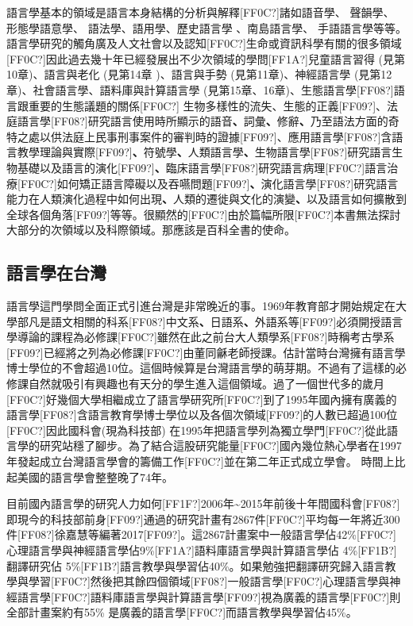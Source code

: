 語言學基本的領域是語言本身結構的分析與解釋[FF0C?]諸如語音學、 聲韻學、 形態學語意學、 語法學、語用學、歷史語言學 、南島語言學、 手語語言學等等。語言學研究的觸角廣及人文社會以及認知[FF0C?]生命或資訊科學有關的很多領域[FF0C?]因此過去幾十年已經發展出不少次領域的學問[FF1A?]兒童語言習得 (見第10章)、語言與老化 (見第14章 )、語言與手勢 (見第11章)、神經語言學 (見第12章)、社會語言學、語料庫與計算語言學 (見第15章、16章)、生態語言學[FF08?]語言跟重要的生態議題的關係[FF0C?] 生物多樣性的流失、生態的正義[FF09?]、法庭語言學[FF08?]研究語言使用時所顯示的語音\textbf{、}詞彙\textbf{、}修辭\textbf{、}乃至語法方面的奇特之處以供法庭上民事刑事案件的審判時的證據[FF09?]、應用語言學[FF08?]含語言教學理論與實際[FF09?]\textbf{、}符號學\textbf{、}人類語言學\textbf{、}生物語言學[FF08?]研究語言生物基礎以及語言的演化[FF09?]\textbf{、}臨床語言學[FF08?]研究語言病理[FF0C?]語言治療[FF0C?]如何矯正語言障礙以及吞嚥問題[FF09?]\textbf{、}演化語言學[FF08?]研究語言能力在人類演化過程中如何出現\textbf{、}人類的遷徙與文化的演變\textbf{、}以及語言如何擴散到全球各個角落[FF09?]等等。很顯然的[FF0C?]由於篇幅所限[FF0C?]本書無法探討大部分的次領域以及科際領域。那應該是百科全書的使命。

\subsection{語言學在台灣} %

語言學這門學問全面正式引進台灣是非常晚近的事。1969年教育部才開始規定在大學部凡是語文相關的科系[FF08?]中文系\textbf{、}日語系\textbf{、}外語系等[FF09?]必須開授語言學導論的課程為必修課[FF0C?]雖然在此之前台大人類學系[FF08?]時稱考古學系[FF09?]已經將之列為必修課[FF0C?]由董同龢老師授課。估計當時台灣擁有語言學博士學位的不會超過10位。這個時候算是台灣語言學的萌芽期。不過有了這樣的必修課自然就吸引有興趣也有天分的學生進入這個領域。過了一個世代多的歲月[FF0C?]好幾個大學相繼成立了語言學研究所[FF0C?]到了1995年國內擁有廣義的語言學[FF08?]含語言教育學博士學位以及各個次領域[FF09?]的人數已超過100位[FF0C?]因此國科會(現為科技部) 在1995年把語言學列為獨立學門[FF0C?]從此語言學的研究站穩了腳步。為了結合這股研究能量[FF0C?]國內幾位熱心學者在1997年發起成立台灣語言學會的籌備工作[FF0C?]並在第二年正式成立學會。 時間上比起美國的語言學會整整晚了74年。

目前國內語言學的研究人力如何[FF1F?]2006年{\textasciitilde}2015年前後十年間國科會[FF08?]即現今的科技部前身[FF09?]通過的研究計畫有2867件[FF0C?]平均每一年將近300件[FF08?]徐嘉慧等編著2017[FF09?]。這2867計畫案中一般語言學佔42\%[FF0C?]心理語言學與神經語言學佔9\%[FF1A?]語料庫語言學與計算語言學佔 4\%[FF1B?]翻譯研究佔 5\%[FF1B?]語言教學與學習佔40\%。如果勉強把翻譯研究歸入語言教學與學習[FF0C?]然後把其餘四個領域[FF08?]一般語言學[FF0C?]心理語言學與神經語言學[FF0C?]語料庫語言學與計算語言學[FF09?]視為廣義的語言學[FF0C?]則全部計畫案約有55\% 是廣義的語言學[FF0C?]而語言教學與學習佔45\%。

